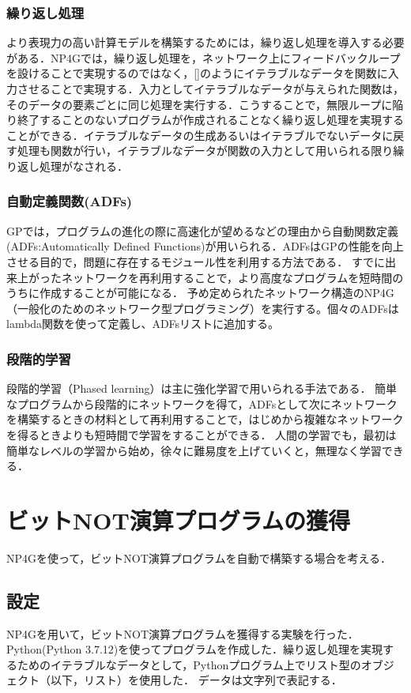 \documentclass[exploratorypaper]{jsaiart} %
\begin{document}
\subsubsection{繰り返し処理}
より表現力の高い計算モデルを構築するためには，繰り返し処理を導入する必要がある．NP4Gでは，繰り返し処理を，ネットワーク上にフィードバックループを設けることで実現するのではなく，[]のようにイテラブルなデータを関数に入力させることで実現する．入力としてイテラブルなデータが与えられた関数は，そのデータの要素ごとに同じ処理を実行する．こうすることで，無限ループに陥り終了することのないプログラムが作成されることなく繰り返し処理を実現することができる．イテラブルなデータの生成あるいはイテラブルでないデータに戻す処理も関数が行い，イテラブルなデータが関数の入力として用いられる限り繰り返し処理がなされる．

\subsubsection{自動定義関数(ADFs)}
GPでは，プログラムの進化の際に高速化が望めるなどの理由から自動関数定義(ADFs:Automatically Defined Functions)\cite{adfs}が用いられる．ADFsはGPの性能を向上させる目的で，問題に存在するモジュール性を利用する方法である．
すでに出来上がったネットワークを再利用することで，より高度なプログラムを短時間のうちに作成することが可能になる．
予め定められたネットワーク構造のNP4G（一般化のためのネットワーク型プログラミング）を実行する。個々のADFsはlambda関数を使って定義し、ADFsリストに追加する。


\subsubsection{段階的学習}
段階的学習（Phased learning）は主に強化学習で用いられる手法である\cite{hodohara2012reinforcement}．
簡単なプログラムから段階的にネットワークを得て，ADFsとして次にネットワークを構築するときの材料として再利用することで，はじめから複雑なネットワークを得るときよりも短時間で学習をすることができる．
人間の学習でも，最初は簡単なレベルの学習から始め，徐々に難易度を上げていくと，無理なく学習できる．

\section{ビットNOT演算プログラムの獲得}
NP4Gを使って，ビットNOT演算プログラムを自動で構築する場合を考える．

\subsection{設定}
NP4Gを用いて，ビットNOT演算プログラムを獲得する実験を行った．
Python(Python 3.7.12)を使ってプログラムを作成した．繰り返し処理を実現するためのイテラブルなデータとして，Pythonプログラム上でリスト型のオブジェクト（以下，リスト）を使用した．
データは文字列で表記する．
\end{document}
